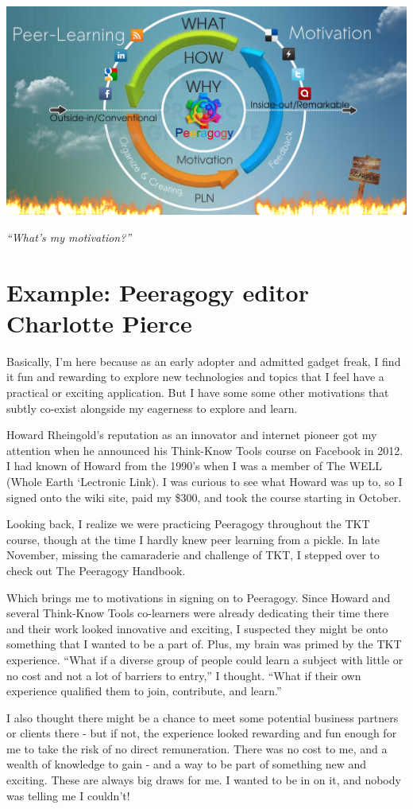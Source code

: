 \begin{center}
\includegraphics[width=.5\textwidth]{../pictures/pln-cycle.jpg}
\end{center}

\emph{``What's my motivation?''}

\section*{Example: Peeragogy editor Charlotte Pierce}

Basically, I'm here because as an early adopter and admitted gadget
freak, I find it fun and rewarding to explore new technologies and
topics that I feel have a practical or exciting application. But I have
some some other motivations that subtly co-exist alongside my eagerness
to explore and learn.

Howard Rheingold's reputation as an innovator and internet pioneer got
my attention when he announced his Think-Know Tools course on Facebook
in 2012. I had known of Howard from the 1990's when I was a member of
The WELL (Whole Earth `Lectronic Link). I was curious to see what Howard
was up to, so I signed onto the wiki site, paid my \$300, and took the
course starting in October.

Looking back, I realize we were practicing Peeragogy throughout the TKT
course, though at the time I hardly knew peer learning from a pickle. In
late November, missing the camaraderie and challenge of TKT, I stepped
over to check out The Peeragogy Handbook.

Which brings me to motivations in signing on to Peeragogy. Since Howard
and several Think-Know Tools co-learners were already dedicating their
time there and their work looked innovative and exciting, I suspected
they might be onto something that I wanted to be a part of. Plus, my
brain was primed by the TKT experience. ``What if a diverse group of
people could learn a subject with little or no cost and not a lot of
barriers to entry,'' I thought. ``What if their own experience qualified
them to join, contribute, and learn.''

I also thought there might be a chance to meet some potential business
partners or clients there - but if not, the experience looked rewarding
and fun enough for me to take the risk of no direct remuneration. There
was no cost to me, and a wealth of knowledge to gain - and a way to be
part of something new and exciting. These are always big draws for me. I
wanted to be in on it, and nobody was telling me I couldn't!

